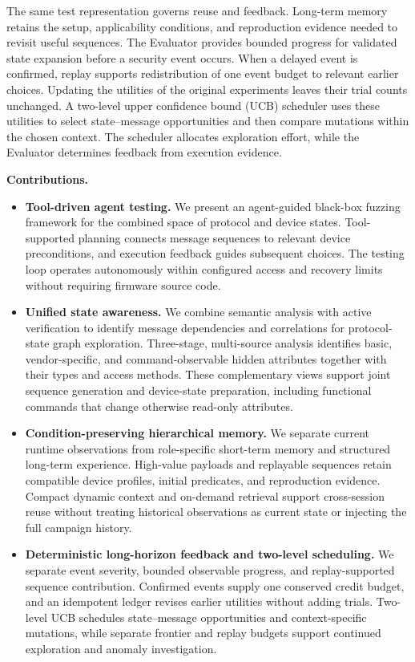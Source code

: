\documentclass[10pt,journal,compsoc]{IEEEtran}
\newcommand{\parab}[1]{\vspace{0.04in}\noindent\textbf{#1}}
\begin{document}
The same test representation governs reuse and feedback. Long-term memory retains the setup, applicability conditions, and reproduction evidence needed to revisit useful sequences. The Evaluator provides bounded progress for validated state expansion before a security event occurs. When a delayed event is confirmed, replay supports redistribution of one event budget to relevant earlier choices. Updating the utilities of the original experiments leaves their trial counts unchanged. A two-level upper confidence bound (UCB) scheduler uses these utilities to select state--message opportunities and then compare mutations within the chosen context. The scheduler allocates exploration effort, while the Evaluator determines feedback from execution evidence.

\parab{Contributions.}
\begin{itemize}
  \item \textbf{Tool-driven agent testing.} We present an agent-guided black-box fuzzing framework for the combined space of protocol and device states. Tool-supported planning connects message sequences to relevant device preconditions, and execution feedback guides subsequent choices. The testing loop operates autonomously within configured access and recovery limits without requiring firmware source code.
  \item \textbf{Unified state awareness.} We combine semantic analysis with active verification to identify message dependencies and correlations for protocol-state graph exploration. Three-stage, multi-source analysis identifies basic, vendor-specific, and command-observable hidden attributes together with their types and access methods. These complementary views support joint sequence generation and device-state preparation, including functional commands that change otherwise read-only attributes.
  \item \textbf{Condition-preserving hierarchical memory.} We separate current runtime observations from role-specific short-term memory and structured long-term experience. High-value payloads and replayable sequences retain compatible device profiles, initial predicates, and reproduction evidence. Compact dynamic context and on-demand retrieval support cross-session reuse without treating historical observations as current state or injecting the full campaign history.
  \item \textbf{Deterministic long-horizon feedback and two-level scheduling.} We separate event severity, bounded observable progress, and replay-supported sequence contribution. Confirmed events supply one conserved credit budget, and an idempotent ledger revises earlier utilities without adding trials. Two-level UCB schedules state--message opportunities and context-specific mutations, while separate frontier and replay budgets support continued exploration and anomaly investigation.

\end{itemize}
\end{document}
